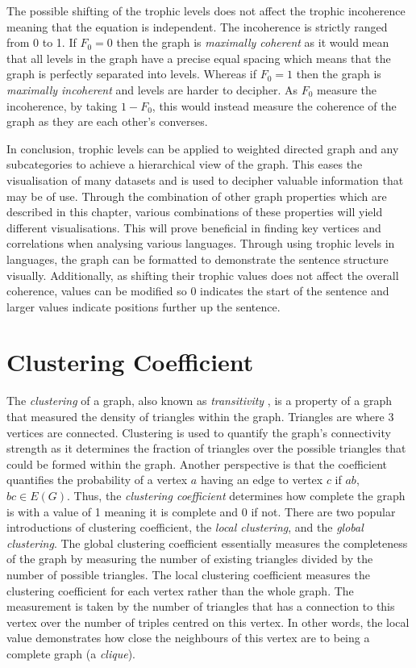 The possible shifting of the trophic levels does not affect the trophic incoherence meaning that the equation is independent. The incoherence is strictly ranged from 0 to 1. If $F_0 = 0$  then the graph is \emph{maximally coherent} as it would mean that all levels in the graph have a precise equal spacing which means that the graph is perfectly separated into levels. Whereas if $F_0 = 1$ then the graph is \emph{maximally incoherent} and levels are harder to decipher. As $F_0$ measure the incoherence, by taking $1 - F_0$, this would instead measure the coherence of the graph as they are each other's converses. 
\newline

In conclusion, trophic levels can be applied to weighted directed graph and any subcategories to achieve a hierarchical view of the graph. This eases the visualisation of many datasets and is used to decipher valuable information that may be of use. Through the combination of other graph properties which are described in this chapter, various combinations of these properties will yield different visualisations. This will prove beneficial in finding key vertices and correlations when analysing various languages. Through using trophic levels in languages, the graph can be formatted to demonstrate the sentence structure visually. Additionally, as shifting their trophic values does not affect the overall coherence, values can be modified so 0 indicates the start of the sentence and larger values indicate positions further up the sentence.

\section{Clustering Coefficient}
The \emph{clustering} of a graph, also known as \emph{transitivity} \cite{schank2005approximating}, is a property of a graph that measured the density of triangles within the graph. Triangles are where 3 vertices are connected. Clustering is used to quantify the graph's connectivity strength as it determines the fraction of triangles over the possible triangles that could be formed within the graph. Another perspective is that the coefficient quantifies the probability of a vertex $a$ having an edge to vertex $c$ if $ab$, $bc \in E(G)$. Thus, the \emph{clustering coefficient} determines how complete the graph is with a value of 1 meaning it is complete and 0 if not. There are two popular introductions of clustering coefficient, the \emph{local clustering}, and the \emph{global clustering}. The global clustering coefficient essentially measures the completeness of the graph by measuring the number of existing triangles divided by the number of possible triangles. The local clustering coefficient measures the clustering coefficient for each vertex rather than the whole graph. The measurement is taken by the number of triangles that has a connection to this vertex over the number of triples centred on this vertex. In other words, the local value demonstrates how close the neighbours of this vertex are to being a complete graph (a \emph{clique}).

